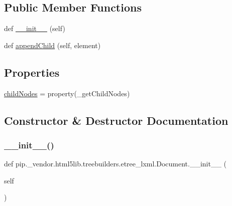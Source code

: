 \subsection*{Public Member Functions}
\begin{DoxyCompactItemize}
\item 
def \hyperlink{classpip_1_1__vendor_1_1html5lib_1_1treebuilders_1_1etree__lxml_1_1Document_a0f8a5f673e21bfde5b00052e35f7731b}{\+\_\+\+\_\+init\+\_\+\+\_\+} (self)
\item 
def \hyperlink{classpip_1_1__vendor_1_1html5lib_1_1treebuilders_1_1etree__lxml_1_1Document_a289abb5a0dc80ba753c45d91d9c8beae}{append\+Child} (self, element)
\end{DoxyCompactItemize}
\subsection*{Properties}
\begin{DoxyCompactItemize}
\item 
\hyperlink{classpip_1_1__vendor_1_1html5lib_1_1treebuilders_1_1etree__lxml_1_1Document_ae5438ba7c6daf3671755a668a0e4399c}{child\+Nodes} = property(\+\_\+get\+Child\+Nodes)
\end{DoxyCompactItemize}


\subsection{Constructor \& Destructor Documentation}
\mbox{\label{classpip_1_1__vendor_1_1html5lib_1_1treebuilders_1_1etree__lxml_1_1Document_a0f8a5f673e21bfde5b00052e35f7731b}} 
\subsubsection{\texorpdfstring{\+\_\+\+\_\+init\+\_\+\+\_\+()}{\_\_init\_\_()}}
{\footnotesize\ttfamily def pip.\+\_\+vendor.\+html5lib.\+treebuilders.\+etree\+\_\+lxml.\+Document.\+\_\+\+\_\+init\+\_\+\+\_\+ (\begin{DoxyParamCaption}\item[{}]{self }\end{DoxyParamCaption})}



